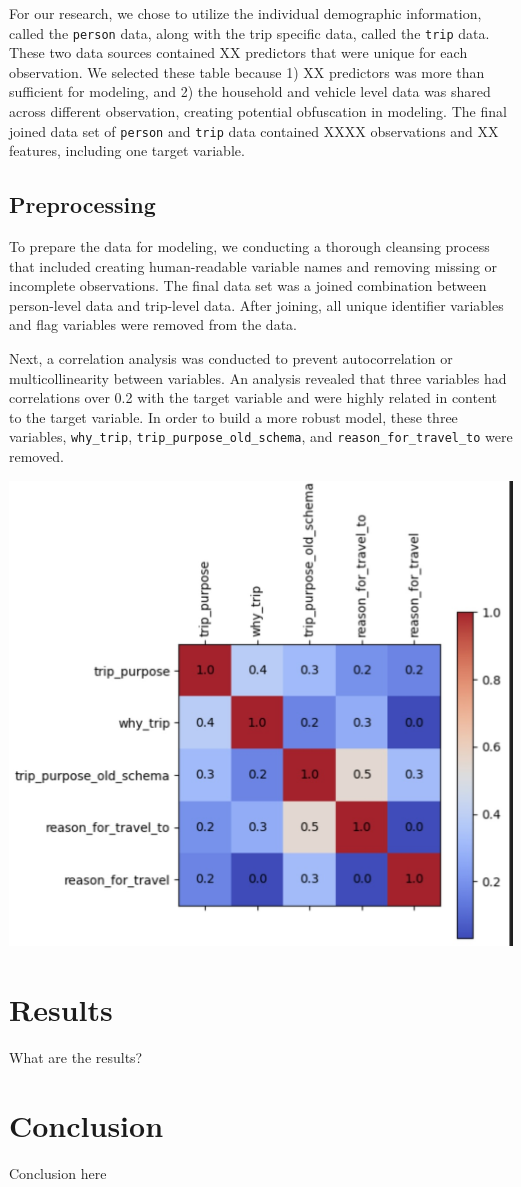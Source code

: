 \documentclass[
  article,
  nofooter]{jss}
\begin{document}
For our research, we chose to utilize the individual demographic
information, called the \texttt{person} data, along with the trip
specific data, called the \texttt{trip} data. These two data sources
contained XX predictors that were unique for each observation. We
selected these table because 1) XX predictors was more than sufficient
for modeling, and 2) the household and vehicle level data was shared
across different observation, creating potential obfuscation in
modeling. The final joined data set of \texttt{person} and \texttt{trip}
data contained XXXX observations and XX features, including one target
variable.

\subsection{Preprocessing}\label{preprocessing}

To prepare the data for modeling, we conducting a thorough cleansing
process that included creating human-readable variable names and
removing missing or incomplete observations. The final data set was a
joined combination between person-level data and trip-level data. After
joining, all unique identifier variables and flag variables were removed
from the data.

Next, a correlation analysis was conducted to prevent autocorrelation or
multicollinearity between variables. An analysis revealed that three
variables had correlations over 0.2 with the target variable and were
highly related in content to the target variable. In order to build a
more robust model, these three variables, \texttt{why\_trip},
\texttt{trip\_purpose\_old\_schema}, and
\texttt{reason\_for\_travel\_to} were removed.

\includegraphics{imgs/correlation-matrix.jpg}

\section{Results}\label{results}

What are the results?

\section{Conclusion}\label{conclusion}

Conclusion here


  
\end{document}
